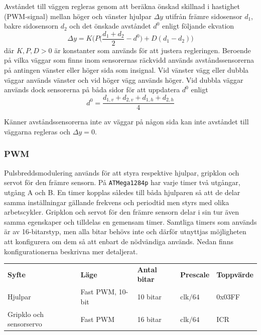 \documentclass[11pt]{article}
\begin{document}
\begin{flushleft}
Avståndet till väggen regleras genom att beräkna önskad skillnad i hastighet (PWM-signal) mellan höger och vänster hjulpar $\Delta y$ utifrån främre sidosensor $d_1$, bakre sidosensorn $d_2$ och det önskade avståndet $d^0$ enligt följande ekvation
\begin{equation*}
	\Delta y = K \Bigg( P \Big( \frac {d_1 + d_2} {2} - d^0 \Big) + D (d_1 - d_2) \Bigg)
\end{equation*}
där $K, P, D > 0$ är konstanter som används för att justera regleringen. Beroende på vilka väggar som finns inom sensorernas räckvidd används avståndssensorerna på antingen vänster eller höger sida som insignal. Vid vänster vägg eller dubbla väggar används vänster och vid höger vägg används höger. Vid dubbla väggar används dock sensorerna på båda sidor för att uppdatera  $d^0$ enligt
\begin{equation*}
	d^0 = \frac {d_{1,v} + d_{2,v} + d_{1,h} + d_{2,h}} {4}
\end{equation*}

Känner avståndssensorerna inte av väggar på någon sida kan inte avståndet till väggarna regleras och $\Delta y = 0$.


\subsubsection{PWM}
Pulsbreddsmodulering används för att styra respektive hjulpar, gripklon och servot för den främre sensorn. På \verb+ATMega1284p+ har varje timer två utgångar, utgång A och B. En timer kopplas således till båda hjulparen så att de delar samma inställningar gällande frekvens och periodtid men styrs med olika arbetscykler. Gripklon och servot för den främre sensorn delar i sin tur även samma egenskaper och tilldelas en gemensam timer. Samtliga timers som används är av 16-bitarstyp, men alla bitar behövs inte och därför utnyttjas möjligheten att konfigurera om dem så att enbart de nödvändiga används. Nedan finns konfigurationerna beskrivna mer detaljerat. 

\begin{center}
\begin{tabular}{l l l l l}

    \textbf{Syfte} & \textbf{Läge} & \textbf{Antal bitar} & \textbf{Prescale} & \textbf{Toppvärde} \\
    Hjulpar & Fast PWM, 10-bit & 10 bitar & $\text{clk}/64$ &  0x03FF \\
	Gripklo och sensorservo & Fast PWM & 16 bitar & $\text{clk}/64$  & ICR \\
\end{tabular}
\end{center}


\end{flushleft}
\end{document}
